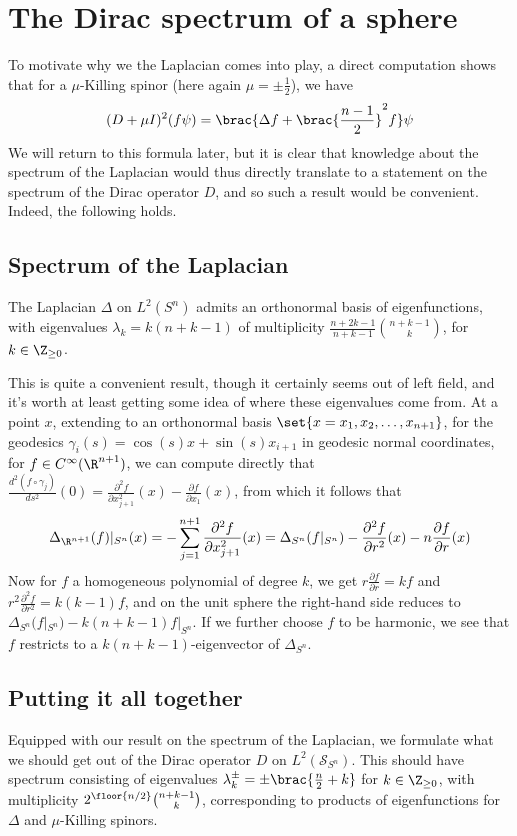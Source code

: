 \documentclass[11pt]{article}
\renewcommand{\S}{\mathcal{S}}
\begin{document}
\section{The Dirac spectrum of a sphere}
To motivate why we the Laplacian comes into play, a direct computation shows that for a $\mu$-Killing spinor (here again $\mu = \pm\frac12$), we have
$$
    (D + \mu I)^2(f\psi) = \brac{\Delta f + \brac{\frac{n - 1}{2}}^2f}\psi
$$
We will return to this formula later, but it is clear that knowledge about the spectrum of the Laplacian would thus directly translate to a statement on the spectrum of the Dirac operator $D$, and so such a result would be convenient. Indeed, the following holds.
\subsection{Spectrum of the Laplacian}
\begin{theorem}
    The Laplacian $\Delta$ on $L^2(S^n)$ admits an orthonormal basis of eigenfunctions, with eigenvalues $\lambda_k = k(n + k - 1)$ of multiplicity $\frac{n + 2k - 1}{n + k - 1}{n + k - 1 \choose k}$, for $k \in \Z_{\geq 0}$.
\end{theorem}
This is quite a convenient result, though it certainly seems out of left field, and it's worth at least getting some idea of where these eigenvalues come from. At a point $x$, extending to an orthonormal basis $\set{x = x_1, x_2, \ldots, x_{n + 1}}$, for the geodesics $\gamma_i(s) = \cos(s)x + \sin(s)x_{i + 1}$ in geodesic normal coordinates, for $f \in C^\infty(\R^{n + 1})$, we can compute directly that $\frac{d^2(f \circ \gamma_j)}{ds^2}(0) = \frac{\partial^2f}{\partial x_{j + 1}^2}(x) - \frac{\partial f}{\partial x_1}(x)$, from which it follows that
$$
    \Delta_{\R^{n + 1}}(f)|_{S^n}(x) = -\sum_{j = 1}^{n + 1} \frac{\partial^2f}{\partial x_{j + 1}^2}(x) = \Delta_{S^n}(f|_{S^n}) - \frac{\partial^2 f}{\partial r^2}(x) - n\frac{\partial f}{\partial r}(x)
$$
Now for $f$ a homogeneous polynomial of degree $k$, we get $r\frac{\partial f}{\partial r} = kf$ and $r^2\frac{\partial^2 f}{\partial r^2} = k(k - 1)f$, and on the unit sphere the right-hand side reduces to $\Delta_{S^n}(f|_{S^n}) - k(n + k - 1)f|_{S^n}$. If we further choose $f$ to be harmonic, we see that $f$ restricts to a $k(n + k - 1)$-eigenvector of $\Delta_{S^n}$.
\subsection{Putting it all together}
Equipped with our result on the spectrum of the Laplacian, we formulate what we should get out of the Dirac operator $D$ on $L^2(\S_{S^n})$. This should have spectrum consisting of eigenvalues $\lambda_k^\pm = \pm \brac{\frac n2 + k}$ for $k \in \Z_{\geq 0}$, with multiplicity $2^{\floor{n / 2}}{n + k - 1 \choose k}$, corresponding to products of eigenfunctions for $\Delta$ and $\mu$-Killing spinors.
\end{document}
